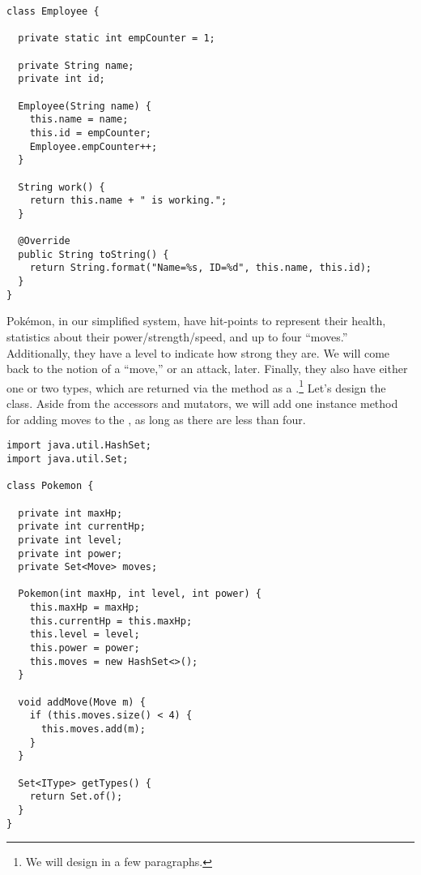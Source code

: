 \begin{lstlisting}[language=MyJava]
class Employee {

  private static int empCounter = 1;

  private String name;
  private int id;

  Employee(String name) {
    this.name = name;
    this.id = empCounter;
    Employee.empCounter++;
  }

  String work() {
    return this.name + " is working.";
  }

  @Override
  public String toString() {
    return String.format("Name=%s, ID=%d", this.name, this.id);
  } 
}
\end{lstlisting}


Pok\'emon, in our simplified system, have hit-points to represent their health, statistics about their power/strength/speed, and up to four ``moves.'' Additionally, they have a level to indicate how strong they are. We will come back to the notion of a ``move,'' or an attack, later. Finally, they also have either one or two types, which are returned via the  method as a .\footnote{We will design  in a few paragraphs.} Let's design the  class. Aside from the accessors and mutators, we will add one instance method for adding moves to the , as long as there are less than four. 

\begin{lstlisting}[language=MyJava]
import java.util.HashSet;
import java.util.Set; 

class Pokemon {
  
  private int maxHp;
  private int currentHp;
  private int level;
  private int power;
  private Set<Move> moves;

  Pokemon(int maxHp, int level, int power) {
    this.maxHp = maxHp;
    this.currentHp = this.maxHp;
    this.level = level;
    this.power = power;
    this.moves = new HashSet<>();
  }

  void addMove(Move m) { 
    if (this.moves.size() < 4) {
      this.moves.add(m);
    }
  }

  Set<IType> getTypes() {
    return Set.of();
  }
}
\end{lstlisting}

